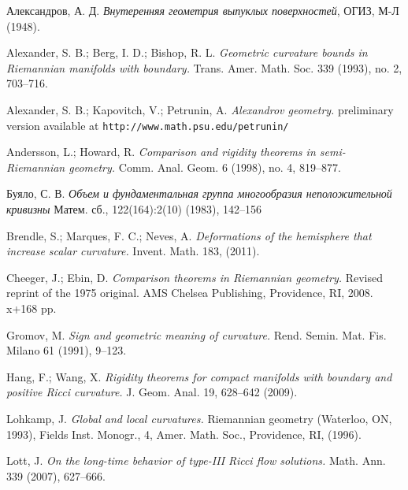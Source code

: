 \documentclass[oneside,a4paper]{article}
\begin{document}
\begin{thebibliography}{52}

\begin{otherlanguage}{russian}
Александров, А. Д. \textit{Внутеренняя геометрия выпуклых поверхностей}, ОГИЗ, М-Л (1948).
\end{otherlanguage}

Alexander, S. B.; Berg, I. D.; Bishop, R. L. \textit{Geometric curvature bounds in Riemannian manifolds with boundary.} Trans. Amer. Math. Soc. 339 (1993), no. 2, 703--716.

Alexander, S. B.; Kapovitch, V.; Petrunin, A. \textit{Alexandrov geometry.}
preliminary version available at {\tt http://www.math.psu.edu/petrunin/}

Andersson, L.; Howard, R.
\textit{Comparison and rigidity theorems in semi-Riemannian geometry.}
Comm. Anal. Geom. 6 (1998), no. 4, 819--877.

  \begin{otherlanguage}{russian}
Буяло, С. В. \textit{Объем и фундаментальная группа многообразия неположительной кривизны}
Матем. сб., 122(164):2(10) (1983),  142--156                   
\end{otherlanguage}


Brendle, S.; Marques, F. C.;  Neves, A.
\textit{Deformations of the hemisphere that increase scalar curvature.}
Invent. Math.  183,  (2011).

Cheeger, J.; Ebin, D. \textit{Comparison theorems in Riemannian geometry.} Revised reprint of the 1975 original. AMS Chelsea Publishing, Providence, RI, 2008. x+168 pp.

 Gromov, M. \textit{Sign and geometric meaning of curvature.}
Rend. Semin. Mat. Fis. Milano 61 (1991), 9--123.

Hang, F.; Wang, X.  \textit{Rigidity theorems for compact manifolds with boundary and
positive Ricci curvature.} J. Geom. Anal. 19, 628--642 (2009).


 Lohkamp, J. \textit{Global and local curvatures.} Riemannian geometry (Waterloo, ON, 1993), Fields Inst. Monogr., 4, Amer. Math. Soc., Providence, RI, (1996).

  Lott, J. \textit{On the long-time behavior of type-III Ricci flow solutions.} Math. Ann. 339 (2007),
627--666.


\end{thebibliography}
\end{document}
